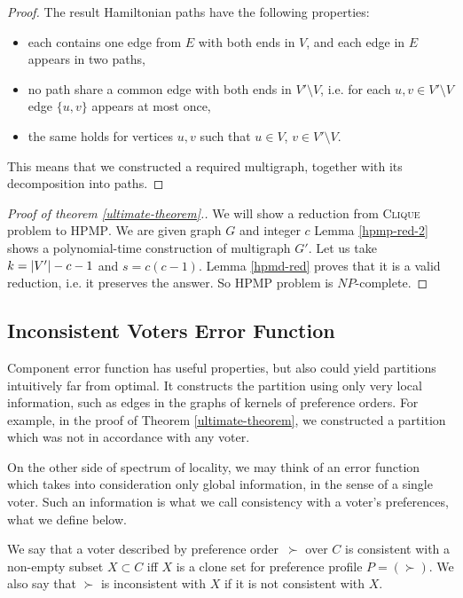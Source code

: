 \begin{proof}
The result Hamiltonian paths have the following properties:
\begin{itemize}
\item each contains one edge from $E$ with both ends in $V$,
  and each edge in $E$ appears in two paths,
\item no path share a common edge with both ends in $V' \setminus V$,
  i.e. for each $u,v \in V' \setminus V$ edge $\{u,v\}$ appears at most once,
\item the same holds for vertices $u,v$ such that $u \in V$, $v \in V' \setminus V$.
\end{itemize}
This means that we constructed a required multigraph, together with its decomposition into paths.
\end{proof}

\begin{proof}[Proof of theorem \ref{ultimate-theorem}.]
We will show a reduction from \textsc{Clique} problem to \textsc{HPMP}.
We are given graph $G$ and integer $c$
Lemma \ref{hpmp-red-2} shows a polynomial-time construction of multigraph $G'$.
Let us take $k=\left\vert V' \right\vert-c-1$ and $s=c(c-1)$.
Lemma \ref{hpmd-red} proves that it is a valid reduction, i.e. it preserves the answer.
So \textsc{HPMP} problem is $NP$-complete.
\end{proof}


\subsection{Inconsistent Voters Error Function}

Component error function has useful properties, but also could yield partitions
intuitively far from optimal.
It constructs the partition using only very local information,
such as edges in the graphs of kernels of preference orders.
For example, in the proof of Theorem \ref{ultimate-theorem}, we constructed a partition
which was not in accordance with any voter.

On the other side of spectrum of locality, we may think of an error function which
takes into consideration only global information, in the sense of a single voter.
Such an information is what we call consistency with a voter's preferences, what we define below.

\begin{defn}
We say that a voter described by preference order~$\succ$ over $C$
is consistent with a non-empty subset $X \subset C$
iff $X$ is a clone set for preference profile $P = (\succ)$.
We also say that $\succ$ is inconsistent with $X$ if it is not consistent with $X$.
\end{defn}

